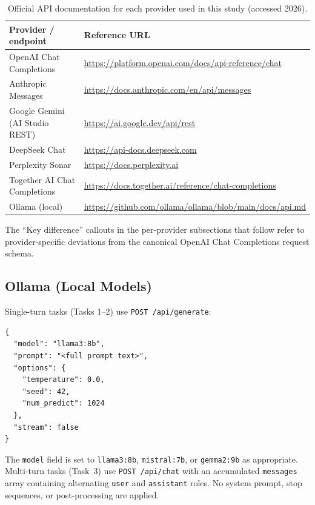 \documentclass[11pt]{article}
\begin{document}
\begin{table}[H]
\centering
\caption{Official API documentation for each provider used in this study (accessed 2026).}
\label{tab:apidocs}
\small
\begin{tabular}{@{}ll@{}}
\toprule
\textbf{Provider / endpoint} & \textbf{Reference URL} \\
\midrule
OpenAI Chat Completions       & \url{https://platform.openai.com/docs/api-reference/chat} \\
Anthropic Messages            & \url{https://docs.anthropic.com/en/api/messages} \\
Google Gemini (AI Studio REST)& \url{https://ai.google.dev/api/rest} \\
DeepSeek Chat                 & \url{https://api-docs.deepseek.com} \\
Perplexity Sonar              & \url{https://docs.perplexity.ai} \\
Together AI Chat Completions  & \url{https://docs.together.ai/reference/chat-completions} \\
Ollama (local)                & \url{https://github.com/ollama/ollama/blob/main/docs/api.md} \\
\bottomrule
\end{tabular}
\par\smallskip\raggedright\footnotesize
The ``Key difference'' callouts in the per-provider subsections that follow refer to provider-specific deviations from the canonical OpenAI Chat Completions request schema.
\end{table}

\subsection{Ollama (Local Models)}

Single-turn tasks (Tasks 1--2) use \texttt{POST /api/generate}:

\begin{lstlisting}[caption={Ollama generate payload (Tasks 1--2).}]
{
  "model": "llama3:8b",
  "prompt": "<full prompt text>",
  "options": {
    "temperature": 0.0,
    "seed": 42,
    "num_predict": 1024
  },
  "stream": false
}
\end{lstlisting}

\noindent The \texttt{model} field is set to \texttt{llama3:8b}, \texttt{mistral:7b}, or \texttt{gemma2:9b} as appropriate. Multi-turn tasks (Task~3) use \texttt{POST /api/chat} with an accumulated \texttt{messages} array containing alternating \texttt{user} and \texttt{assistant} roles. No system prompt, stop sequences, or post-processing are applied.
\end{document}
